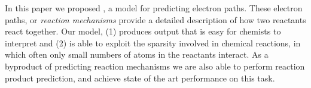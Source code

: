 
In this paper we proposed \ourModel, a model for predicting electron paths.
These electron paths, or {\em reaction mechanisms} provide a detailed description of how two reactants react together. 
Our model, (1) produces output that is easy for chemists to interpret and (2) is able to exploit the sparsity involved in chemical reactions, in which often only small numbers of atoms in the reactants interact.
As a byproduct of predicting reaction mechanisms we are also able to perform reaction product prediction,
 and achieve state of the art performance on this task.